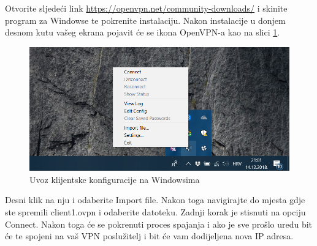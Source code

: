Otvorite sljedeći link \url{https://openvpn.net/community-downloads/} i skinite program za Windowse te pokrenite instalaciju. Nakon instalacije u donjem desnom kutu vašeg ekrana pojavit će se ikona OpenVPN-a kao na slici \ref{fig:win-open-vpn-2}.
\begin{figure}[h]
	\centering
	\includegraphics[width=0.7\linewidth]{slike/OpenVPN/win-open-vpn-2}
	\caption[Uvoz klijentske konfiguracije na Windowsima]{Uvoz klijentske konfiguracije na Windowsima}
	\label{fig:win-open-vpn-2}
\end{figure}
Desni klik na nju i odaberite Import file. Nakon toga navigirajte do mjesta gdje ste spremili client1.ovpn i odaberite datoteku. Zadnji korak je stisnuti na opciju Connect. Nakon toga će se pokrenuti proces spajanja i ako je sve prošlo uredu bit će te spojeni na vaš VPN poslužitelj i bit će vam dodijeljena nova IP adresa.

\bigbreak
